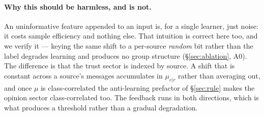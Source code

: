 \paragraph{Why this should be harmless, and is not.} An uninformative feature
appended to an input is, for a single learner, just noise: it costs sample
efficiency and nothing else. That intuition is correct here too, and we verify it
--- keying the same shift to a per-source \emph{random} bit rather than the label
degrades learning and produces no group structure (\S\ref{sec:ablation}, A0). The
difference is that the trust sector is indexed by source. A shift that is constant
across a source's messages accumulates in $\mu_{e|r}$ rather than averaging out,
and once $\mu$ is class-correlated the anti-learning prefactor of
\S\ref{sec:rule} makes the opinion sector class-correlated too. The feedback runs
in both directions, which is what produces a threshold rather than a gradual
degradation.
